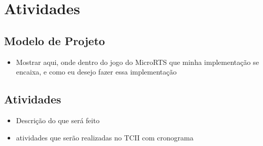 \chapter{\label{chap:ativ}Atividades}

\section{Modelo de Projeto}
\begin{itemize}
	\item Mostrar aqui, onde dentro do jogo do MicroRTS que minha implementação se encaixa, e como eu desejo fazer essa implementação
\end{itemize}

\section{Atividades}
\begin{itemize}
	\item Descrição do que será feito
	\item atividades que serão realizadas no TCII com cronograma
\end{itemize}


